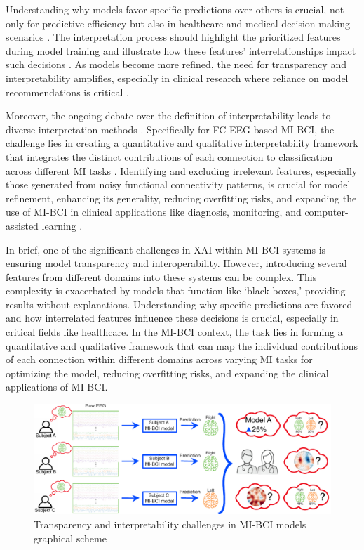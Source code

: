 Understanding why models favor specific predictions over others is crucial, not only for predictive efficiency but also in healthcare and medical decision-making scenarios \cite{miotto2018deep}. The interpretation process should highlight the prioritized features during model training and illustrate how these features' interrelationships impact such decisions \cite{zeiler2014visualizing, chakraborty2017interpretability}. As models become more refined, the need for transparency and interpretability amplifies, especially in clinical research where reliance on model recommendations is critical \cite{xiao2018opportunities}.

Moreover, the ongoing debate over the definition of interpretability leads to diverse interpretation methods \cite{fan2021interpretability}. Specifically for FC EEG-based MI-BCI, the challenge lies in creating a quantitative and qualitative interpretability framework that integrates the distinct contributions of each connection to classification across different MI tasks \cite{zuk2020eeg}. Identifying and excluding irrelevant features, especially those generated from noisy functional connectivity patterns, is crucial for model refinement, enhancing its generality, reducing overfitting risks, and expanding the use of MI-BCI in clinical applications like diagnosis, monitoring, and computer-assisted learning \cite{qian2018brain}.

In brief, one of the significant challenges in XAI within MI-BCI systems is ensuring model transparency and interoperability. However, introducing several features from different domains into these systems can be complex. This complexity is exacerbated by models that function like ‘black boxes,’ providing results without explanations. Understanding why specific predictions are favored and how interrelated features influence these decisions is crucial, especially in critical fields like healthcare. In the MI-BCI context, the task lies in forming a quantitative and qualitative framework that can map the individual contributions of each connection within different domains across varying MI tasks for optimizing the model, reducing overfitting risks, and expanding the clinical applications of MI-BCI.

\begin{figure}[!h]
    \centering
    \includegraphics[width=1.0\linewidth]{Figures/problem_statement/problem3_FV.pdf}
    \caption{Transparency and interpretability challenges in MI-BCI models graphical scheme \label{fig:problem_3}}
\end{figure}


